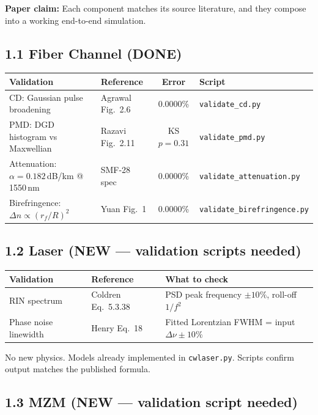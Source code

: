 \documentclass[11pt,a4paper]{article}
\begin{document}
\textbf{Paper claim:} Each component matches its source literature, and they
compose into a working end-to-end simulation.

\subsection{1.1  Fiber Channel (DONE)}

\begin{tabularx}{\textwidth}{L{4.5cm} L{3.5cm} c L{3.5cm}}
\toprule
Validation & Reference & Error & Script \\
\midrule
CD: Gaussian pulse broadening & Agrawal Fig.~2.6 & 0.0000\%
    & \texttt{validate\_cd.py} \\
PMD: DGD histogram vs Maxwellian & Razavi Fig.~2.11 & KS $p=0.31$
    & \texttt{validate\_pmd.py} \\
Attenuation: $\alpha=0.182$\,dB/km @ 1550\,nm & SMF-28 spec & 0.0000\%
    & \texttt{validate\_attenuation.py} \\
Birefringence: $\Delta n \propto (r_f/R)^2$ & Yuan Fig.~1 & 0.0000\%
    & \texttt{validate\_birefringence.py} \\
\bottomrule
\end{tabularx}

\subsection{1.2  Laser (NEW --- validation scripts needed)}

\begin{tabularx}{\textwidth}{L{4cm} L{4cm} L{4cm}}
\toprule
Validation & Reference & What to check \\
\midrule
RIN spectrum & Coldren Eq.~5.3.38
    & PSD peak frequency $\pm10\%$, roll-off $1/f^2$ \\
Phase noise linewidth & Henry Eq.~18
    & Fitted Lorentzian FWHM = input $\Delta\nu \pm10\%$ \\
\bottomrule
\end{tabularx}

No new physics. Models already implemented in \texttt{cwlaser.py}.
Scripts confirm output matches the published formula.

\subsection{1.3  MZM (NEW --- validation script needed)}
\end{document}
